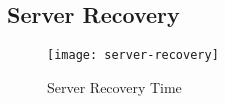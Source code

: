 \subsection{Server Recovery}
\label{sub:eval:server-recovery}


\begin{figure}
    \centering
    \texttt{[image: server-recovery]}
    \caption{Server Recovery Time}
    \label{fig:server-recovery}
\end{figure}